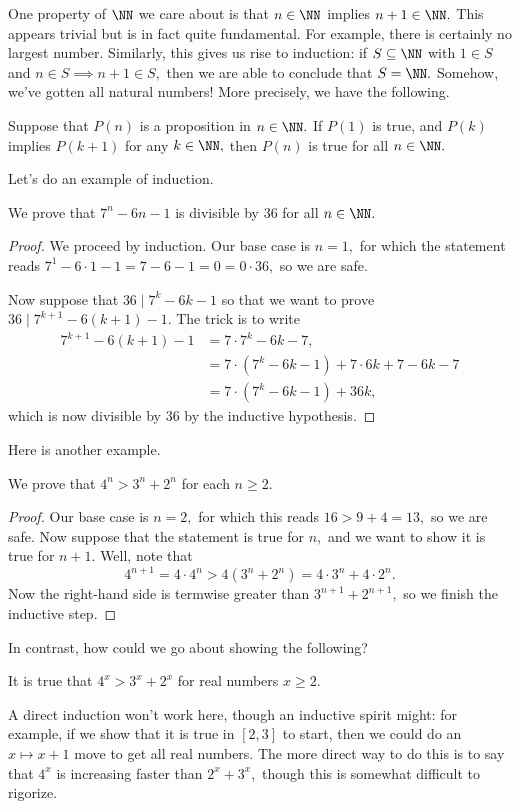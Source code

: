 \documentclass[../notes.tex]{subfiles}
\begin{document}
One property of $\NN$ we care about is that $n\in\NN$ implies $n+1\in\NN.$ This appears trivial but is in fact quite fundamental. For example, there is certainly no largest number. Similarly, this gives us rise to induction: if $S\subseteq\NN$ with $1\in S$ and $n\in S\implies n+1\in S,$ then we are able to conclude that $S=\NN.$ Somehow, we've gotten all natural numbers! More precisely, we have the following.
\begin{ax}
	Suppose that $P(n)$ is a proposition in $n\in\NN.$ If $P(1)$ is true, and $P(k)$ implies $P(k+1)$ for any $k\in\NN,$ then $P(n)$ is true for all $n\in\NN.$
\end{ax}
Let's do an example of induction.
\begin{prop}[Ross 1.7]
	We prove that $7^n-6n-1$ is divisible by $36$ for all $n\in\NN.$
\end{prop}
\begin{proof}
	We proceed by induction. Our base case is $n=1,$ for which the statement reads $7^1-6\cdot1-1=7-6-1=0=0\cdot36,$ so we are safe.
	
	Now suppose that $36\mid7^k-6k-1$ so that we want to prove $36\mid7^{k+1}-6(k+1)-1.$ The trick is to write
	\begin{align*}
		7^{k+1}-6(k+1)-1 &= 7\cdot7^k-6k-7, \\
		&= 7\cdot\left(7^k-6k-1\right)+7\cdot6k+7-6k-7 \\
		&= 7\cdot\left(7^k-6k-1\right)+36k,
	\end{align*}
	which is now divisible by $36$ by the inductive hypothesis.
\end{proof}

Here is another example.
\begin{prop}
    We prove that $4^n>3^n+2^n$ for each $n\ge2.$
\end{prop}
\begin{proof}
    Our base case is $n=2,$ for which this reads $16>9+4=13,$ so we are safe. Now suppose that the statement is true for $n,$ and we want to show it is true for $n+1.$ Well, note that
    \[4^{n+1}=4\cdot4^n>4\left(3^n+2^n\right)=4\cdot3^n+4\cdot2^n.\]
    Now the right-hand side is termwise greater than $3^{n+1}+2^{n+1},$ so we finish the inductive step.
\end{proof}
In contrast, how could we go about showing the following?
\begin{prop}
    It is true that $4^x>3^x+2^x$ for real numbers $x\ge2.$
\end{prop}
A direct induction won't work here, though an inductive spirit might: for example, if we show that it is true in $[2,3]$ to start, then we could do an $x\mapsto x+1$ move to get all real numbers. The more direct way to do this is to say that $4^x$ is increasing faster than $2^x+3^x,$ though this is somewhat difficult to rigorize.
\end{document}
